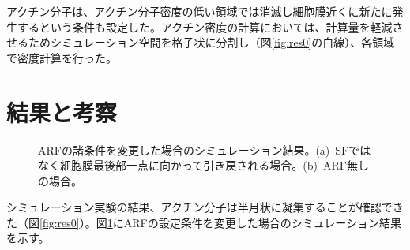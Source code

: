 \documentclass[10pt,twocolumn,a4j]{jarticle}
\begin{document}
アクチン分子は、アクチン分子密度の低い領域では消滅し細胞膜近くに新たに発生するという条件も設定した。アクチン密度の計算においては、計算量を軽減させるためシミュレーション空間を格子状に分割し（図\ref{fig:res0}の白線）、各領域で密度計算を行った。
\section{結果と考察}
\begin{figure}[tbp]
\centering
  \caption{ARFの諸条件を変更した場合のシミュレーション結果。(a)~SFではなく細胞膜最後部一点に向かって引き戻される場合。(b)~ARF無しの場合。}
 \label{fig:res1}
\end{figure}
シミュレーション実験の結果、アクチン分子は半月状に凝集することが確認できた（図\ref{fig:res0}）。図\ref{fig:res1}にARFの設定条件を変更した場合のシミュレーション結果を示す。
\end{document}
